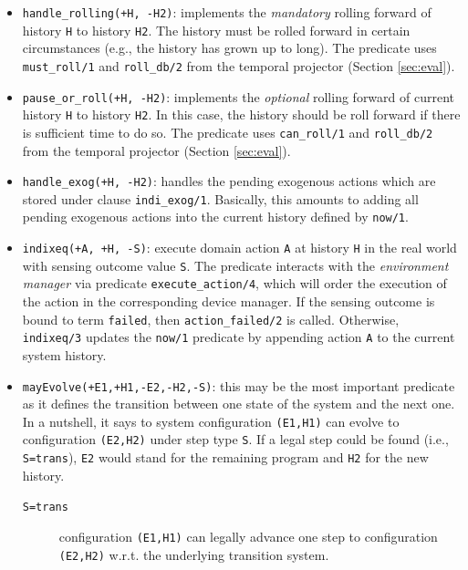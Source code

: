 \documentclass[11pt]{article}
\begin{document}
\begin{itemize}
\item \texttt{handle\_rolling(+H, -H2)}: implements the \emph{mandatory} rolling
forward of history \texttt{H} to history \texttt{H2}. The history must be 
rolled  forward in certain circumstances (e.g., the history has grown up to
long). The predicate uses \texttt{must\_roll/1} and \texttt{roll\_db/2}
from the temporal projector (Section \ref{sec:eval}).
  
\item \texttt{pause\_or\_roll(+H, -H2)}: implements the \emph{optional} rolling
forward of current history \texttt{H} to history \texttt{H2}. In this case,
the history should be roll forward if there is sufficient time to do so. 
The predicate uses \texttt{can\_roll/1} and \texttt{roll\_db/2}
from the temporal projector (Section \ref{sec:eval}).
  
\item \texttt{handle\_exog(+H, -H2)}: handles the pending exogenous actions
which are stored under clause \texttt{indi\_exog/1}. Basically, this amounts to
adding all pending exogenous actions into the current history defined by
\texttt{now/1}.
  
\item \texttt{indixeq(+A, +H, -S)}: execute domain action \texttt{A} at history
  \texttt{H} in the real world with sensing outcome value \texttt{S}.  The
  predicate interacts with the \emph{environment manager} via predicate
  \texttt{execute\_action/4}, which will order the execution of the
  action in the corresponding device manager.
  If the sensing outcome is bound to term \texttt{failed}, then
  \texttt{action\_failed/2} is called. Otherwise, \texttt{indixeq/3} updates the
  \texttt{now/1} predicate by  appending action \texttt{A} to the current system
  history.
  
\item \texttt{mayEvolve(+E1,+H1,-E2,-H2,-S)}: this may be the most
  important predicate as it defines the transition between one state of the
  system and the next one. 
  In a nutshell, it says to system configuration \texttt{(E1,H1)} can
  evolve to configuration \texttt{(E2,H2)} under step type \texttt{S}.
  If a legal step could be found (i.e., \texttt{S=trans}), \texttt{E2} would
  stand for the remaining program and \texttt{H2} for the new history.

  \begin{description}
  \item[\texttt{S=trans}] configuration \texttt{(E1,H1)} can legally advance one
    step to configuration \texttt{(E2,H2)} w.r.t. the underlying transition
    system.
    

\end{description}
\end{itemize}
\end{document}
